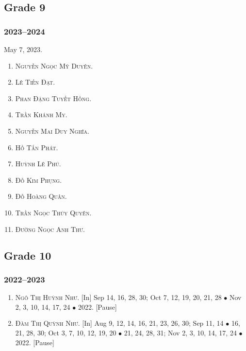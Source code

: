 \documentclass{article}
\begin{document}

\subsection{Grade 9}

\subsubsection{2023--2024}
May 7, 2023.
\begin{enumerate}
	\item \textsc{Nguyễn Ngọc Mỹ Duyên.}
	\item \textsc{Lê Tiến Đạt.}
	\item \textsc{Phan Đặng Tuyết Hồng.}
	\item \textsc{Trần Khánh My.}
	\item \textsc{Nguyễn Mai Duy Nghĩa.}
	\item \textsc{Hồ Tấn Phát.}
	\item \textsc{Huỳnh Lê Phú.}
	\item \textsc{Đỗ Kim Phụng.}
	\item \textsc{Đỗ Hoàng Quân.}
	\item \textsc{Trần Ngọc Thúy Quyên.} 
	\item \textsc{Đường Ngọc Anh Thư.}
\end{enumerate}


\subsection{Grade 10}

\subsubsection{2022--2023}

\begin{enumerate}
	\item \textsc{Ngô Thị Huỳnh Như.} \textsf{[In]} Sep 14, 16, 28, 30; Oct 7, 12, 19, 20, 21, 28 $\bullet$ Nov 2, 3, 10, 14, 17, 24 $\bullet$ 2022. \textsf{[Pause]}
	\item \textsc{Đàm Thị Quỳnh Như.} \textsf{[In]} Aug 9, 12, 14, 16, 21, 23, 26, 30; Sep 11, 14 $\bullet$ 16, 21, 28, 30; Oct 3, 7, 10, 12, 19, 20 $\bullet$ 21, 24, 28, 31; Nov 2, 3, 10, 14, 17, 24 $\bullet$ 2022. \textsf{[Pause]}
\end{enumerate}
\end{document}
